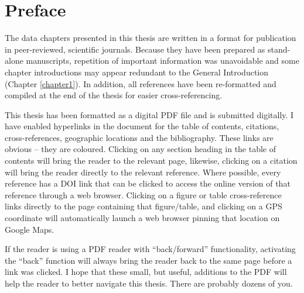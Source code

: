 \chapter{Preface}

The data chapters presented in this thesis are written in a format for publication in peer-reviewed, scientific journals. 
Because they have been prepared as stand-alone manuscripts, repetition of important information was unavoidable and some chapter introductions may appear redundant to the General Introduction (Chapter \ref{chapter1}).
In addition, all references have been re-formatted and compiled at the end of the thesis for easier cross-referencing.

This thesis has been formatted as a digital PDF file and is submitted digitally. I have enabled hyperlinks in the document for the table of contents, citations, cross-references, geographic locations and the bibliography. 
These links are obvious -- they are coloured.
Clicking on any section heading in the table of contents will bring the reader to the relevant page, likewise, clicking on a citation will bring the reader directly to the relevant reference.
Where possible, every reference has a DOI link that can be clicked to access the online version of that reference through a web browser.
Clicking on a figure or table cross-reference links directly to the page containing that figure/table, and clicking on a GPS coordinate will automatically launch a web browser pinning that location on Google Maps.

If the reader is using a PDF reader with ``back/forward'' functionality, activating the ``back'' function will always bring the reader back to the same page before a link was clicked.
I hope that these small, but useful, additions to the PDF will help the reader to better navigate this thesis.
There are probably dozens of you.


\cleardoublepage

\mainmatter

\setlength{\parindent}{0em} %

